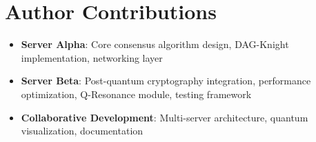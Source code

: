 \documentclass[11pt,a4paper]{article}
\begin{document}
\section*{Author Contributions}

\begin{itemize}
    \item \textbf{Server Alpha}: Core consensus algorithm design, DAG-Knight implementation, networking layer
    \item \textbf{Server Beta}: Post-quantum cryptography integration, performance optimization, Q-Resonance module, testing framework
    \item \textbf{Collaborative Development}: Multi-server architecture, quantum visualization, documentation
\end{itemize}

\newpage

\end{document}
